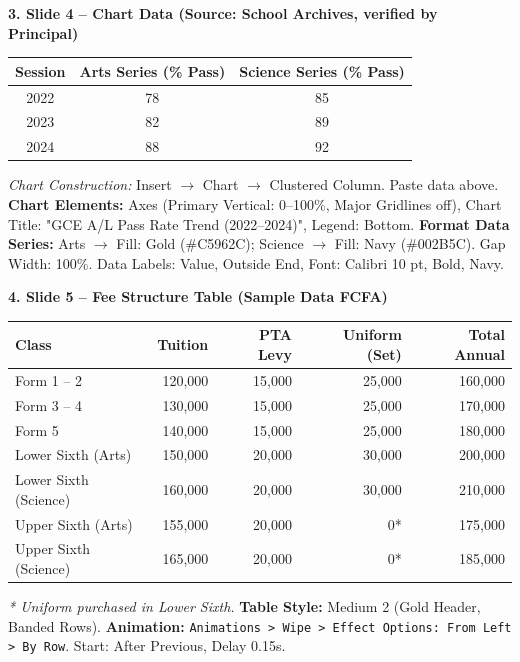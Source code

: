 \documentclass[11pt]{article}
\begin{document}
\textbf{3. Slide 4 -- Chart Data (Source: School Archives, verified by Principal)}
\begin{center}
\begin{tabular}{|c|c|c|}\hline
\rowcolor{popblueL} \textbf{Session} & \textbf{Arts Series (\% Pass)} & \textbf{Science Series (\% Pass)} \\ \hline
2022 & 78 & 85 \\ \hline
2023 & 82 & 89 \\ \hline
2024 & 88 & 92 \\ \hline
\end{tabular}
\end{center}
\textit{Chart Construction:} Insert $\rightarrow$ Chart $\rightarrow$ Clustered Column. Paste data above. \textbf{Chart Elements:} Axes (Primary Vertical: 0--100\%, Major Gridlines off), Chart Title: "GCE A/L Pass Rate Trend (2022--2024)", Legend: Bottom. \textbf{Format Data Series:} Arts $\rightarrow$ Fill: Gold (\#C5962C); Science $\rightarrow$ Fill: Navy (\#002B5C). Gap Width: 100\%. Data Labels: Value, Outside End, Font: Calibri 10 pt, Bold, Navy.

\textbf{4. Slide 5 -- Fee Structure Table (Sample Data FCFA)}
\begin{center}
\begin{tabular}{|l|r|r|r|r|}\hline
\rowcolor{popgold} \textbf{Class} & \textbf{Tuition} & \textbf{PTA Levy} & \textbf{Uniform (Set)} & \textbf{Total Annual} \\ \hline
Form 1 -- 2 & 120,000 & 15,000 & 25,000 & 160,000 \\ \hline
Form 3 -- 4 & 130,000 & 15,000 & 25,000 & 170,000 \\ \hline
Form 5 & 140,000 & 15,000 & 25,000 & 180,000 \\ \hline
Lower Sixth (Arts) & 150,000 & 20,000 & 30,000 & 200,000 \\ \hline
Lower Sixth (Science) & 160,000 & 20,000 & 30,000 & 210,000 \\ \hline
Upper Sixth (Arts) & 155,000 & 20,000 & 0* & 175,000 \\ \hline
Upper Sixth (Science) & 165,000 & 20,000 & 0* & 185,000 \\ \hline
\end{tabular}
\end{center}
\emph{* Uniform purchased in Lower Sixth.} \textbf{Table Style:} Medium 2 (Gold Header, Banded Rows). \textbf{Animation:} \texttt{Animations > Wipe > Effect Options: From Left > By Row}. Start: After Previous, Delay 0.15s.
\end{document}
